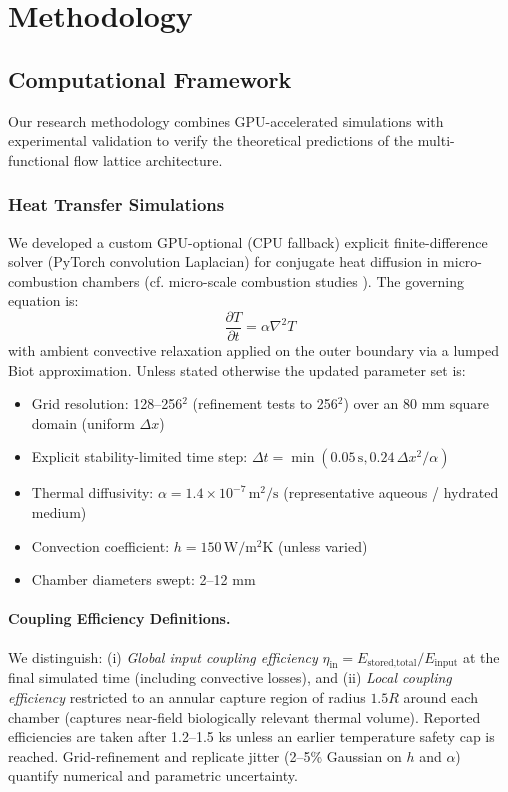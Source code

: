 \section{Methodology}
\label{sec:methodology}

\subsection{Computational Framework}

Our research methodology combines GPU-accelerated simulations with experimental validation to verify the theoretical predictions of the multi-functional flow lattice architecture.

\subsubsection{Heat Transfer Simulations}

We developed a custom GPU-optional (CPU fallback) explicit finite-difference solver (PyTorch convolution Laplacian) for conjugate heat diffusion in micro-combustion chambers (cf. micro-scale combustion studies \cite{fernandez2002micropower,maruta2011micro,ronney2003analysis,waitz1998combustors}). The governing equation is:
\begin{equation}
    \frac{\partial T}{\partial t} = \alpha \nabla^2 T
\end{equation}
with ambient convective relaxation applied on the outer boundary via a lumped Biot approximation. Unless stated otherwise the updated parameter set is:
\begin{itemize}
    \item Grid resolution: 128--256$^2$ (refinement tests to 256$^2$) over an 80 mm square domain (uniform $\Delta x$)
    \item Explicit stability-limited time step: $\Delta t = \min(0.05\,\mathrm{s}, 0.24\,\Delta x^2/\alpha)$
    \item Thermal diffusivity: $\alpha = 1.4\times10^{-7}\,\mathrm{m^2/s}$ (representative aqueous / hydrated medium)
    \item Convection coefficient: $h=150\,\mathrm{W/m^2K}$ (unless varied)
    \item Chamber diameters swept: 2--12 mm
\end{itemize}

\paragraph{Coupling Efficiency Definitions.} We distinguish: (i) \emph{Global input coupling efficiency} $\eta_{\text{in}} = E_{\text{stored,total}}/E_{\text{input}}$ at the final simulated time (including convective losses), and (ii) \emph{Local coupling efficiency} restricted to an annular capture region of radius $1.5R$ around each chamber (captures near-field biologically relevant thermal volume). Reported efficiencies are taken after 1.2--1.5 ks unless an earlier temperature safety cap is reached. Grid-refinement and replicate jitter (2--5\% Gaussian on $h$ and $\alpha$) quantify numerical and parametric uncertainty.

